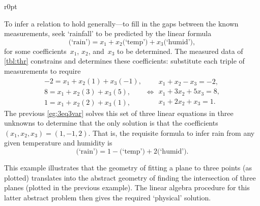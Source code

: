 \begin{example}
\begin{solution} 
\begin{wrapfigure}r{0pt}
\end{wrapfigure}
To infer a relation to hold generally---to fill in the gaps between the known measurements, seek `rainfall' to be predicted by the linear formula
\begin{equation*}
\text{(`rain')}=x_1+x_2\text{(`temp')}+x_3\text{(`humid')},
\end{equation*}
for some coefficients~\(x_1\), \(x_2\), and~\(x_3\) to be determined.
The measured data of \cref{tbl:thr} constrains and determines these coefficients:
substitute each triple of measurements to require
\begin{equation*}
\begin{array}{l}
-2=x_1+x_2(1)+x_3(-1),
\\ 8=x_1+x_2(3)+x_3(5),
\\1=x_1+x_2(2)+x_3(1),
\end{array}
\iff
\begin{array}{l}
x_1+x_2-x_3=-2,
\\ x_1+3x_2+5x_3=8,
\\x_1+2x_2+x_3=1.
\end{array}
\end{equation*}
The previous \cref{eg:3eq3var} solves this set of three linear equations in three unknowns to determine that the only solution is that the coefficients \((x_1,x_2,x_3)=(1,-1,2)\).
That is, the requisite formula to infer rain from any given temperature and humidity is 
\begin{equation*}
\text{(`rain')}=1-\text{(`temp')}+2\text{(`humid')}.
\end{equation*}

This example illustrates that the geometry of fitting a plane to three points (as plotted) translates into the abstract geometry of finding the intersection of three planes (plotted in the previous example).
The linear algebra procedure for this latter abstract problem then gives the required `physical' solution.
\end{solution}
\end{example}


